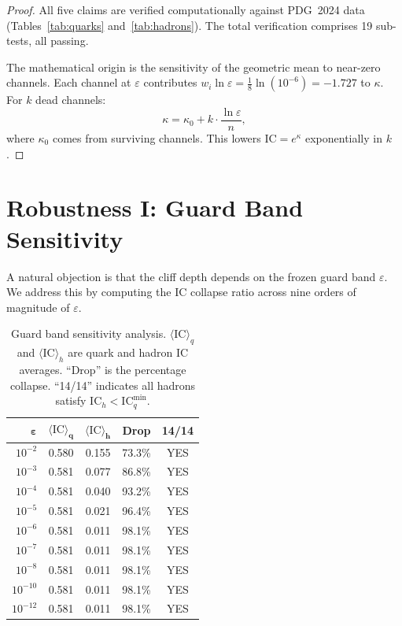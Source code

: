 \documentclass[11pt,a4paper]{article}
\theoremstyle{plain}
\theoremstyle{definition}
\theoremstyle{remark}
\newcommand{\eps}{\varepsilon}
\newcommand{\beq}{\begin{equation}}
\newcommand{\eeq}{\end{equation}}
\newcommand{\IC}{\mathrm{IC}}
\begin{document}
\begin{proof}
All five claims are verified computationally against PDG~2024
data~\cite{pdg2024} (Tables~\ref{tab:quarks}
and~\ref{tab:hadrons}).  The total verification comprises 19
sub-tests, all passing.

The mathematical origin is the sensitivity of the geometric mean
to near-zero channels.  Each channel at $\eps$ contributes
$w_i \ln \eps = \frac{1}{8}\ln(10^{-6}) = -1.727$ to $\kappa$.
For $k$ dead channels:
\beq\label{eq:kappa_dead}
  \kappa = \kappa_0 + k \cdot \frac{\ln \eps}{n},
\eeq
where $\kappa_0$ comes from surviving channels.  This lowers
$\IC = e^{\kappa}$ exponentially in $k$.
\end{proof}


\section{Robustness I: Guard Band Sensitivity}\label{sec:epsilon}

A natural objection is that the cliff depth depends on the
frozen guard band $\eps$.  We address this by computing the
IC collapse ratio across nine orders of magnitude of $\eps$.

\begin{table}[H]
\caption{Guard band sensitivity analysis.
$\langle\IC\rangle_q$ and $\langle\IC\rangle_h$ are quark and
hadron IC averages.  ``Drop'' is the percentage collapse.
``14/14'' indicates all hadrons satisfy
$\IC_h < \IC_q^{\min}$.}
\label{tab:epsilon}
\centering\small
\begin{tabular}{@{}rcccc@{}}
\toprule
$\bm{\eps}$ & $\bm{\langle\IC\rangle_q}$ &
  $\bm{\langle\IC\rangle_h}$ &
  \textbf{Drop} & \textbf{14/14} \\
\midrule
$10^{-2}$  & 0.580 & 0.155 & 73.3\% & \textcolor{WeldGreen}{YES} \\
$10^{-3}$  & 0.581 & 0.077 & 86.8\% & \textcolor{WeldGreen}{YES} \\
$10^{-4}$  & 0.581 & 0.040 & 93.2\% & \textcolor{WeldGreen}{YES} \\
$10^{-5}$  & 0.581 & 0.021 & 96.4\% & \textcolor{WeldGreen}{YES} \\
$10^{-6}$  & 0.581 & 0.011 & 98.1\% & \textcolor{WeldGreen}{YES} \\
$10^{-7}$  & 0.581 & 0.011 & 98.1\% & \textcolor{WeldGreen}{YES} \\
$10^{-8}$  & 0.581 & 0.011 & 98.1\% & \textcolor{WeldGreen}{YES} \\
$10^{-10}$ & 0.581 & 0.011 & 98.1\% & \textcolor{WeldGreen}{YES} \\
$10^{-12}$ & 0.581 & 0.011 & 98.1\% & \textcolor{WeldGreen}{YES} \\
\bottomrule
\end{tabular}
\end{table}
\end{document}
